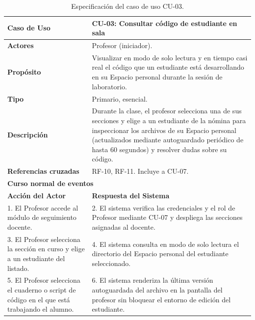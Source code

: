 \begin{table}[H]
\centering
\caption{Especificación del caso de uso CU-03.}
\label{tab:cu_03}
\small
\begin{tabular}{p{} p{}}
\toprule
\textbf{Caso de Uso} & \textbf{CU-03: Consultar código de estudiante en sala} \\
\midrule
\textbf{Actores} & Profesor (iniciador). \\
\textbf{Propósito} & Visualizar en modo de solo lectura y en tiempo casi real el código que un estudiante está desarrollando en su Espacio personal durante la sesión de laboratorio. \\
\textbf{Tipo} & Primario, esencial. \\
\textbf{Descripción} & Durante la clase, el profesor selecciona una de sus secciones y elige a un estudiante de la nómina para inspeccionar los archivos de su Espacio personal (actualizados mediante autoguardado periódico de hasta 60 segundos) y resolver dudas sobre su código. \\
\textbf{Referencias cruzadas} & RF-10, RF-11. Incluye a CU-07. \\
\midrule
\multicolumn{2}{l}{\textbf{Curso normal de eventos}} \\
\midrule
\textbf{Acción del Actor} & \textbf{Respuesta del Sistema} \\
\midrule
1. El Profesor accede al módulo de seguimiento docente. & 2. El sistema verifica las credenciales y el rol de Profesor mediante CU-07 y despliega las secciones asignadas al docente. \\
3. El Profesor selecciona la sección en curso y elige a un estudiante del listado. & 4. El sistema consulta en modo de solo lectura el directorio del Espacio personal del estudiante seleccionado. \\
5. El Profesor selecciona el cuaderno o script de código en el que está trabajando el alumno. & 6. El sistema renderiza la última versión autoguardada del archivo en la pantalla del profesor sin bloquear el entorno de edición del estudiante. \\
\bottomrule
\end{tabular}
\end{table}

